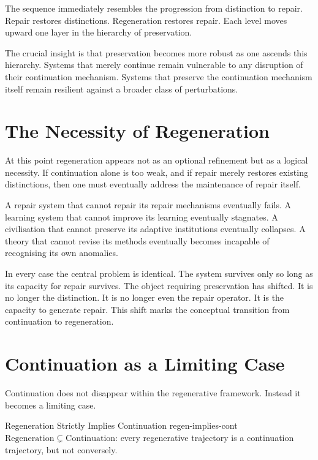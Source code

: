 \documentclass[12pt,twoside,openright]{book}
\begin{document}
The sequence immediately resembles the progression from
distinction to repair. Repair restores distinctions.
Regeneration restores repair. Each level moves upward one
layer in the hierarchy of preservation.

The crucial insight is that preservation becomes more
robust as one ascends this hierarchy. Systems that merely
continue remain vulnerable to any disruption of their
continuation mechanism. Systems that preserve the
continuation mechanism itself remain resilient against a
broader class of perturbations.

\section{The Necessity of Regeneration}
\label{sec:ch10-necessity}

At this point regeneration appears not as an optional
refinement but as a logical necessity. If continuation
alone is too weak, and if repair merely restores existing
distinctions, then one must eventually address the
maintenance of repair itself.

A repair system that cannot repair its repair mechanisms
eventually fails. A learning system that cannot improve its
learning eventually stagnates. A civilisation that cannot
preserve its adaptive institutions eventually collapses. A
theory that cannot revise its methods eventually becomes
incapable of recognising its own anomalies.

In every case the central problem is identical. The system
survives only so long as its capacity for repair survives.
The object requiring preservation has shifted. It is no
longer the distinction. It is no longer even the repair
operator. It is the capacity to generate repair. This shift
marks the conceptual transition from continuation to
regeneration.

\section{Continuation as a Limiting Case}
\label{sec:ch10-limiting}

Continuation does not disappear within the regenerative
framework. Instead it becomes a limiting case.

\begin{proposition}{Regeneration Strictly Implies Continuation}%
  {regen-implies-cont}
  $\mathrm{Regeneration}\subsetneq\mathrm{Continuation}$:
  every regenerative trajectory is a continuation
  trajectory, but not conversely.
\end{proposition}
\end{document}
